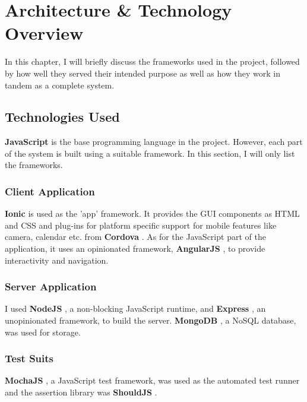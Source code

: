 \chapter{Architecture \& Technology Overview}

In this chapter, I will briefly discuss the frameworks used in the project, followed by how well they served their intended purpose as well as how they work in tandem as a complete system.

\section{Technologies Used}

\textbf{JavaScript} is the base programming language in the project. However, each part of the system is built using a suitable framework. In this section, I will only list the frameworks.

\subsection{Client Application}

\textbf{Ionic} \cite{ionic-site} is used as the 'app' framework. It provides the GUI components as HTML and CSS and plug-ins for platform specific support for mobile  features like camera, calendar etc. from \textbf{Cordova} \cite{ngcordova-site}. As for the JavaScript part of the application, it uses an opinionated framework, \textbf{AngularJS} \cite{angular-site}, to provide interactivity and navigation.

\subsection{Server Application}

I used \textbf{NodeJS} \cite{nodejs-site}, a non-blocking JavaScript runtime, and \textbf{Express} \cite{expressjs-site}, an unopinionated framework, to build the server. \textbf{MongoDB} \cite{mongodb-site}, a NoSQL database, was used for storage.

\subsection{Test Suits}

\textbf{MochaJS} \cite{mocha-site}, a JavaScript test framework, was used as the automated test runner and the assertion library was \textbf{ShouldJS} \cite{shouldjs-site}.

